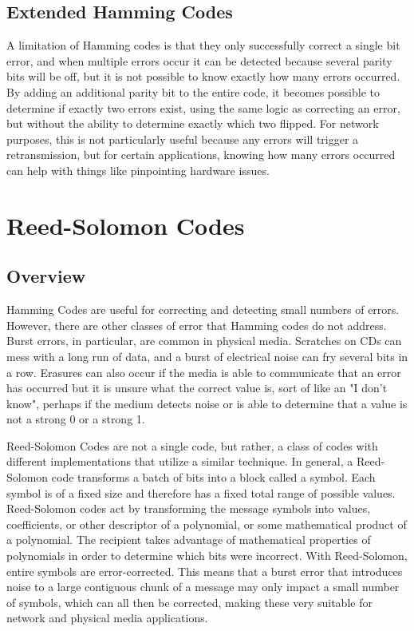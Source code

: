 \documentclass[12pt]{article}
\begin{document}
\subsection{Extended Hamming Codes}

A limitation of Hamming codes is that they only successfully correct a single bit error, and when multiple errors occur it can be detected because several parity bits will be off, but it is not possible to know exactly how many errors occurred. By adding an additional parity bit to the entire code, it becomes possible to determine if exactly two errors exist, using the same logic as correcting an error, but without the ability to determine exactly which two flipped. For network purposes, this is not particularly useful because any errors will trigger a retransmission, but for certain applications, knowing how many errors occurred can help with things like pinpointing hardware issues.

\section{Reed-Solomon Codes}

\subsection{Overview}

Hamming Codes are useful for correcting and detecting small numbers of errors. However, there are other classes of error that Hamming codes do not address. Burst errors, in particular, are common in physical media. Scratches on CDs can mess with a long run of data, and a burst of electrical noise can fry several bits in a row. Erasures can also occur if the media is able to communicate that an error has occurred but it is unsure what the correct value is, sort of like an "I don't know", perhaps if the medium detects noise or is able to determine that a value is not a strong 0 or a strong 1.

Reed-Solomon Codes are not a single code, but rather, a class of codes with different implementations that utilize a similar technique. In general, a Reed-Solomon code transforms a batch of bits into a block called a symbol. Each symbol is of a fixed size and therefore has a fixed total range of possible values. Reed-Solomon codes act by transforming the message symbols into values, coefficients, or other descriptor of a polynomial, or some mathematical product of a polynomial. The recipient takes advantage of mathematical properties of polynomials in order to determine which bits were incorrect. With Reed-Solomon, entire symbols are error-corrected. This means that a burst error that introduces noise to a large contiguous chunk of a message may only impact a small number of symbols, which can all then be corrected, making these very suitable for network and physical media applications. \cite{pless}
\end{document}
